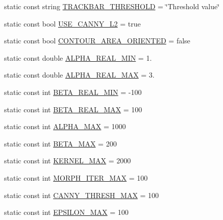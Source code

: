 \begin{DoxyCompactItemize}
static const string \hyperlink{classmultiscale_1_1analysis_1_1RegionDetector_a7548c716410a4cb88cb41498de6b509c}{T\-R\-A\-C\-K\-B\-A\-R\-\_\-\-T\-H\-R\-E\-S\-H\-O\-L\-D} = \char`\"{}Threshold value\char`\"{}
\item 
static const bool \hyperlink{classmultiscale_1_1analysis_1_1RegionDetector_a6a8c4f7b9a6bc40ec6de940f53943772}{U\-S\-E\-\_\-\-C\-A\-N\-N\-Y\-\_\-\-L2} = true
\item 
static const bool \hyperlink{classmultiscale_1_1analysis_1_1RegionDetector_ab1fdebf0daaae6f2bb1fe4770479116f}{C\-O\-N\-T\-O\-U\-R\-\_\-\-A\-R\-E\-A\-\_\-\-O\-R\-I\-E\-N\-T\-E\-D} = false
\item 
static const double \hyperlink{classmultiscale_1_1analysis_1_1RegionDetector_a4a11aa86a5250ca6197589c4ccb770f6}{A\-L\-P\-H\-A\-\_\-\-R\-E\-A\-L\-\_\-\-M\-I\-N} = 1.
\item 
static const double \hyperlink{classmultiscale_1_1analysis_1_1RegionDetector_abc853d2cfef9e4fafbf86715b48495e0}{A\-L\-P\-H\-A\-\_\-\-R\-E\-A\-L\-\_\-\-M\-A\-X} = 3.
\item 
static const int \hyperlink{classmultiscale_1_1analysis_1_1RegionDetector_a87d07b8a993b50bcf050e4c206ac126c}{B\-E\-T\-A\-\_\-\-R\-E\-A\-L\-\_\-\-M\-I\-N} = -\/100
\item 
static const int \hyperlink{classmultiscale_1_1analysis_1_1RegionDetector_a19e9e6c3ea18fe9a3dbf7a1a02652985}{B\-E\-T\-A\-\_\-\-R\-E\-A\-L\-\_\-\-M\-A\-X} = 100
\item 
static const int \hyperlink{classmultiscale_1_1analysis_1_1RegionDetector_a7ca1e136dc9d768f1e11cd6f770d950f}{A\-L\-P\-H\-A\-\_\-\-M\-A\-X} = 1000
\item 
static const int \hyperlink{classmultiscale_1_1analysis_1_1RegionDetector_ad2c6485f637cae5abee0303b41df1480}{B\-E\-T\-A\-\_\-\-M\-A\-X} = 200
\item 
static const int \hyperlink{classmultiscale_1_1analysis_1_1RegionDetector_aa988e3458f774c489e03e3f8bd0db1ed}{K\-E\-R\-N\-E\-L\-\_\-\-M\-A\-X} = 2000
\item 
static const int \hyperlink{classmultiscale_1_1analysis_1_1RegionDetector_adeaa40a86b09bad2530bf179cbb4e602}{M\-O\-R\-P\-H\-\_\-\-I\-T\-E\-R\-\_\-\-M\-A\-X} = 100
\item 
static const int \hyperlink{classmultiscale_1_1analysis_1_1RegionDetector_ad6590f4617a6b3d34c6032f8febd7beb}{C\-A\-N\-N\-Y\-\_\-\-T\-H\-R\-E\-S\-H\-\_\-\-M\-A\-X} = 100
\item 
static const int \hyperlink{classmultiscale_1_1analysis_1_1RegionDetector_a724d57c0db65696f2ddab415deb1138d}{E\-P\-S\-I\-L\-O\-N\-\_\-\-M\-A\-X} = 100

\end{DoxyCompactItemize}
